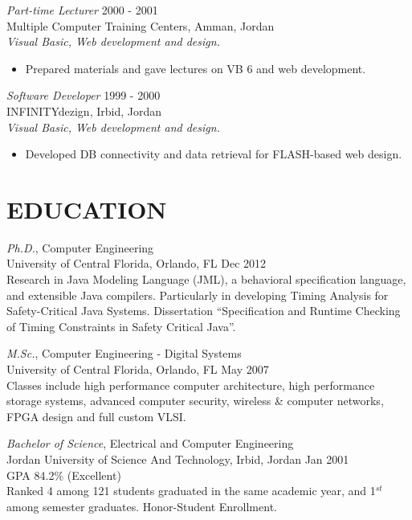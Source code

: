 \documentclass[line,margin]{res}
\begin{document}
\begin{resume}
{\sl Part-time Lecturer} \hfill   2000 - 2001 \\
Multiple Computer Training Centers, Amman, Jordan \\
\textit{Visual Basic, Web development and design.}
\begin{itemize} \itemsep -2pt
     \item Prepared materials and gave lectures on VB 6 and web development.
\end{itemize} 

{\sl Software Developer} \hfill   1999 - 2000 \\
INFINITYdezign, Irbid, Jordan \\
\textit{Visual Basic, Web development and design.}
\begin{itemize} \itemsep -2pt
     \item Developed DB connectivity and data retrieval for FLASH-based web
     design.
\end{itemize} 

\section{EDUCATION}
{\sl Ph.D.}, Computer Engineering \\
University of Central Florida, Orlando, FL \hfill
Dec 2012 \vspace{0.05in} \\ 
Research in Java Modeling Language (JML), a behavioral specification language,
and extensible Java compilers. Particularly in developing Timing Analysis
for Safety-Critical Java Systems. Dissertation ``Specification and Runtime
Checking of Timing Constraints in Safety Critical Java''.

{\sl M.Sc.}, Computer Engineering - Digital Systems \\
University of Central Florida, Orlando, FL \hspace{0.2in}  \hfill
May 2007 \vspace{0.05in} \\ 
Classes include high performance computer architecture, high performance
storage systems, advanced computer security, wireless \& computer networks, FPGA
design and full custom VLSI.

{\sl Bachelor of Science}, Electrical and Computer Engineering \\ 
Jordan University of Science And Technology, Irbid, Jordan       \hfill    Jan
2001 \vspace{0.05in} \\
GPA 84.2\% (Excellent) \\
Ranked 4 among 121 students graduated in the same academic year, and 1$^{st}$
among semester graduates. Honor-Student Enrollment.


\end{resume}
\end{document}
